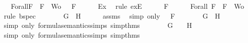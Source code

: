 \begin{isabellebody}
\ {\isasymA}\ \ Forall{}{\isacharcolon}{\isachardoublequoteopen}{\isasymforall}F\ {\isasymin}\ {\isacharparenleft}{\isacharbraceleft}F{\isacharbraceright}\ {\isasymunion}\ Wo{\isacharparenright}{\isachardot}\ {\isasymA}\ {\isasymTurnstile}\ F{\isachardoublequoteclose}\isanewline
\ \ \ \ \isamarkupfalse%
\ Ex{}\ \isamarkupfalse%
\ {\isacharparenleft}rule\ exE{\isacharparenright}\isanewline
\ \ \isamarkupfalse%
\ {\isachardoublequoteopen}{\isasymA}\ {\isasymTurnstile}\ F{\isachardoublequoteclose}\isanewline
\ \ \ \ \isamarkupfalse%
\ Forall{}\ {\isacartoucheopen}F\ {\isasymin}\ {\isacharbraceleft}F{\isacharbraceright}\ {\isasymunion}\ Wo{\isacartoucheclose}\ \isamarkupfalse%
\ {\isacharparenleft}rule\ bspec{\isacharparenright}\isanewline
\ \ \isamarkupfalse%
\ \isamarkupfalse%
\ {\isachardoublequoteopen}{\isasymA}\ {\isasymTurnstile}\ \isactrlbold {\isasymnot}{\isacharparenleft}G\ \isactrlbold {\isasymrightarrow}\ H{\isacharparenright}{\isachardoublequoteclose}\isanewline
\ \ \ \ \isamarkupfalse%
\ assms{\isacharparenleft}{}{\isacharparenright}\ \isamarkupfalse%
\ {\isacharparenleft}simp\ only{\isacharcolon}\ {\isacartoucheopen}{\isasymA}\ {\isasymTurnstile}\ F{\isacartoucheclose}{\isacharparenright}\isanewline
\ \ \isamarkupfalse%
\ \isamarkupfalse%
\ {\isachardoublequoteopen}{\isasymnot}{\isacharparenleft}{\isasymA}\ {\isasymTurnstile}\ {\isacharparenleft}G\ \isactrlbold {\isasymrightarrow}\ H{\isacharparenright}{\isacharparenright}{\isachardoublequoteclose}\isanewline
\ \ \ \ \isamarkupfalse%
\ {\isacharparenleft}simp\ only{\isacharcolon}\ formula{\isacharunderscore}semantics{\isachardot}simps{\isacharparenleft}{}{\isacharparenright}\ simp{\isacharunderscore}thms{\isacharparenleft}{}{\isacharparenright}{\isacharparenright}\isanewline
\ \ \isamarkupfalse%
\ \isamarkupfalse%
\ {\isachardoublequoteopen}{\isasymnot}{\isacharparenleft}{\isasymA}\ {\isasymTurnstile}\ G\ {\isasymlongrightarrow}\ {\isasymA}\ {\isasymTurnstile}\ H{\isacharparenright}{\isachardoublequoteclose}\isanewline
\ \ \ \ \isamarkupfalse%
\ {\isacharparenleft}simp\ only{\isacharcolon}\ formula{\isacharunderscore}semantics{\isachardot}simps{\isacharparenleft}{}{\isacharparenright}\ simp{\isacharunderscore}thms{\isacharparenleft}{}{\isacharparenright}{\isacharparenright}\isanewline

\end{isabellebody}
